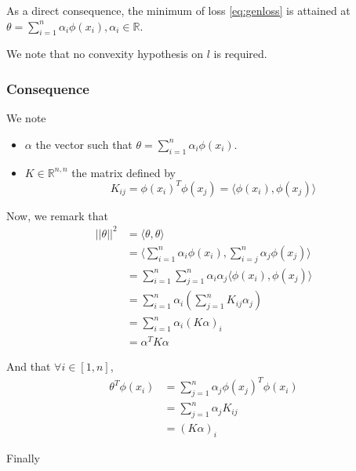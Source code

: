 \documentclass[
10pt, %
a4paper, %
oneside, %
headinclude,footinclude, %
BCOR5mm, %
]{scrartcl}
\begin{document}
\begin{corollary}
    As a direct consequence, the minimum of loss \ref{eq:genloss} is attained at $\theta = \sum^{n}_{i=1} \alpha_i\phi(x_i), \alpha_i\in \mathbb{R}$.

    We note that no convexity hypothesis on $l$ is required.
\end{corollary}

\subsubsection{\large\color{Periwinkle}Consequence}

We note
\begin{itemize}
    \item $\alpha$ the vector such that $\theta = \sum^{n}_{i=1} \alpha_i\phi(x_i)$.
    \item $K\in \mathbb{R}^{n ,n}$ the matrix defined by
	\begin{equation*}
	    K_{ij} = \phi(x_i)^T\phi(x_j) = \langle\phi(x_i), \phi(x_j) \rangle
	\end{equation*}
\end{itemize}

Now, we remark that
\begin{equation*}
    \begin{aligned}
	||\theta||^2&= \langle\theta, \theta \rangle\\
	&= \langle \sum^{n}_{i=1} \alpha_i\phi(x_i) , \sum^{n}_{i=j} \alpha_j\phi(x_j)\rangle\\
	&= \sum^{n}_{i=1} \sum^{n}_{j=1} \alpha_i\alpha_j \langle\phi(x_i), \phi(x_j) \rangle\\
	&= \sum^{n}_{i=1} \alpha_i (\sum^{n}_{j=1} K_{ij}\alpha_j)\\
	&= \sum^{n}_{i=1} \alpha_i (K\alpha)_i\\
	&= \alpha^TK\alpha
    \end{aligned}
\end{equation*}

And that $\forall i\in [1, n]$,
\begin{equation*}
    \begin{aligned}
	\theta^T\phi(x_i)&= \sum^{n}_{j=1} \alpha_j\phi(x_j)^T\phi(x_i)\\
	&= \sum^{n}_{j=1} \alpha_j K_{ij}\\
	&= (K\alpha)_{i}
    \end{aligned}
\end{equation*}

Finally
\end{document}
